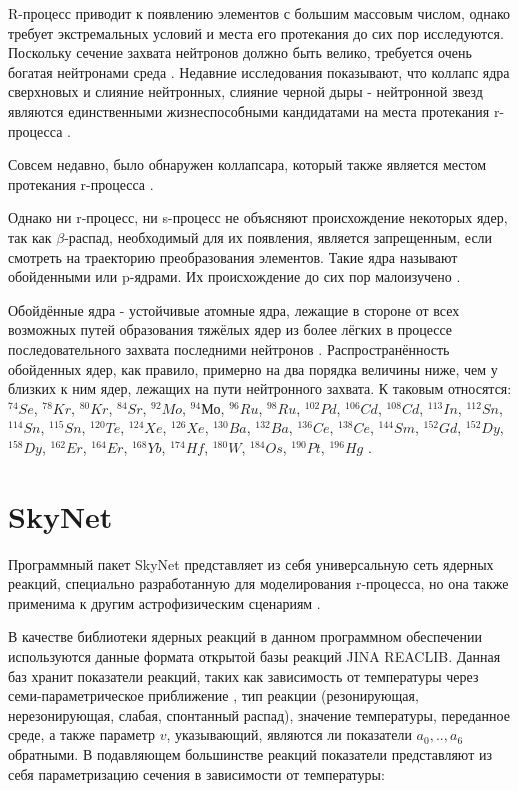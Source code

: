 \documentclass[14pt, a4paper]{article}
\numberwithin{figure}{section}
\numberwithin{equation}{section}
\begin{document}
 R-процесс приводит к появлению элементов с большим массовым числом, однако требует экстремальных условий и места его протекания до сих пор исследуются. Поскольку сечение захвата нейтронов должно быть велико, требуется очень богатая нейтронами среда \cite{places}. Недавние исследования показывают, что коллапс ядра сверхновых и слияние нейтронных, слияние черной дыры - нейтронной звезд являются единственными жизнеспособными кандидатами на места протекания r-процесса \cite{sites, neutrino, nsns, bhns1}. 
 
 Совсем недавно, было обнаружен коллапсара, который также является местом протекания r-процесса \cite{collapsars}.
 
Однако ни r-процесс, ни s-процесс не объясняют происхождение некоторых ядер, так как $\beta$-распад, необходимый для их появления, является запрещенным, если смотреть на траекторию преобразования элементов. Такие ядра называют обойденными или p-ядрами. Их происхождение до сих пор малоизучено \cite{p-process}.

Обойдённые ядра - устойчивые атомные ядра, лежащие в стороне от всех возможных путей образования тяжёлых ядер из более лёгких в процессе последовательного захвата последними нейтронов \cite{reactions}. Распространённость обойденных ядер, как правило, примерно на два порядка величины ниже, чем у близких к ним ядер, лежащих на пути нейтронного захвата. К таковым относятся: $^{74}Se$, $^{78}Kr$, $^{80}Kr$, $^{84}Sr$, $^{92}Mo$, $^{94}Мо$, $^{96}Ru$, $^{98}Ru$, $^{102}Pd$, $^{106}Cd$, $^{108}Cd$, $^{113}In$, $^{112}Sn$, $^{114}Sn$, $^{115}Sn$, $^{120}Te$, $^{124}Xe$, $^{126}Xe$, $^{130}Ba$, $^{132}Ba$, $^{136}Ce$, $^{138}Ce$, $^{144}Sm$, $^{152}Gd$, $^{152}Dy$, $^{158}Dy$, $^{162}Er$, $^{164}Er$, $^{168}Yb$, $^{174}Hf$, $^{180}W$, $^{184}Os$, $^{190}Pt$, $^{196}Hg$ \cite{role}.

\section{SkyNet}

Программный пакет SkyNet представляет из себя универсальную сеть ядерных реакций, специально разработанную для моделирования r-процесса, но она также применима к другим астрофизическим сценариям \cite{skynet}.

В качестве библиотеки ядерных реакций в данном программном обеспечении используются данные формата открытой базы реакций JINA REACLIB.  Данная баз хранит показатели реакций, таких как зависимость от температуры через семи-параметрическое приближение \cite{jina}, тип реакции (резонирующая, нерезонирующая, слабая, спонтанный распад), значение температуры, переданное среде, а также параметр $v$, указывающий, являются ли показатели $a_0, .., a_6$ обратными. В подавляющем большинстве реакций показатели представляют из себя параметризацию сечения в зависимости от температуры:
\end{document}
